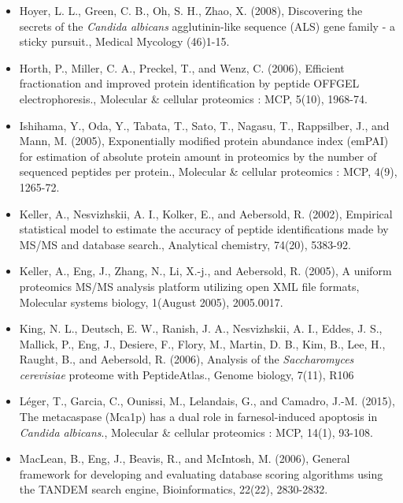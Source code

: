 \begin{itemize}[leftmargin=*]
\item[]{
Hoyer, L. L., Green, C. B., Oh, S. H., Zhao, X.  (2008),
Discovering the secrets of the \textit{Candida albicans} agglutinin-like sequence (ALS) gene family - a sticky pursuit., 
Medical Mycology (46)1-15.
}

\item[]{%
Horth, P., Miller, C. A., Preckel, T., and Wenz, C. (2006), Efficient fractionation and improved
protein identification by peptide OFFGEL electrophoresis., Molecular \& cellular proteomics
: MCP, 5(10), 1968-74.
}

\item[]{%
Ishihama, Y., Oda, Y., Tabata, T., Sato, T., Nagasu, T., Rappsilber, J., and Mann, M. (2005),
Exponentially modified protein abundance index (emPAI) for estimation of absolute protein
amount in proteomics by the number of sequenced peptides per protein., 
Molecular \& cellular proteomics : MCP, 4(9), 1265-72.
}

\item[]{%
Keller, A., Nesvizhskii, A. I., Kolker, E., and Aebersold, R. (2002), Empirical statistical model
to estimate the accuracy of peptide identifications made by MS/MS and database search.,
Analytical chemistry, 74(20), 5383-92.
}

\item[]{%
Keller, A., Eng, J., Zhang, N., Li, X.-j., and Aebersold, R. (2005), A uniform proteomics MS/MS
analysis platform utilizing open XML file formats, Molecular systems biology, 1(August
2005), 2005.0017.
}

\item[]{%
King, N. L., Deutsch, E. W., Ranish, J. A., Nesvizhskii, A. I., Eddes, J. S., Mallick, P., Eng, J.,
Desiere, F., Flory, M., Martin, D. B., Kim, B., Lee, H., Raught, B., and Aebersold, R. (2006),
Analysis of the \textit{Saccharomyces cerevisiae} proteome with PeptideAtlas., Genome biology,
7(11), R106
}

\item[]{%
L\'eger, T., Garcia, C., Ounissi, M., Lelandais, G., and Camadro, J.-M. (2015), 
The metacaspase (Mca1p) has a dual role in farnesol-induced apoptosis in \textit{Candida albicans}.,
Molecular \& cellular proteomics : MCP, 14(1), 93-108.}


\item[]{%
MacLean, B., Eng, J., Beavis, R., and McIntosh, M. (2006), General framework for developing
and evaluating database scoring algorithms using the TANDEM search engine, 
Bioinformatics, 22(22), 2830-2832.
}


\end{itemize}
